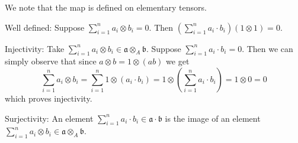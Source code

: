 \newcommand{\sheet}{6}




\maketitle

\begin{exercise}{1}
    We note that the map is defined on elementary tensors.

    Well defined:
    Suppose $\sum^n_{i=1} a_i \otimes b_i = 0$. Then $(\sum^n_{i=1} a_i \cdot
    b_i) (1 \otimes 1) = 0$.

    Injectivity:
    Take $\sum^n_{i=1} a_i \otimes b_i \in \mathfrak{a} \otimes_A \mathfrak{b}$.
    Suppose $\sum^n_{i=1} a_i \cdot b_i = 0$. Then we can simply observe that
    since $a \otimes b = 1 \otimes (a b)$ we get
    \begin{equation*}
        \sum^n_{i=1} a_i \otimes b_i = 
        \sum^n_{i=1} 1 \otimes (a_i \cdot b_i) = 1 \otimes (\sum^n_{i=1} a_i
        \cdot b_i) = 1 \otimes 0 = 0
    \end{equation*}
    which proves injectivity.

    Surjectivity:
    An element $\sum^n_{i=1} a_i \cdot b_i \in \mathfrak{a} \cdot \mathfrak{b}$
    is the image of an element $\sum^n_{i=1} a_i \otimes b_i \in \mathfrak{a}
    \otimes_A \mathfrak{b}$.
\end{exercise}


